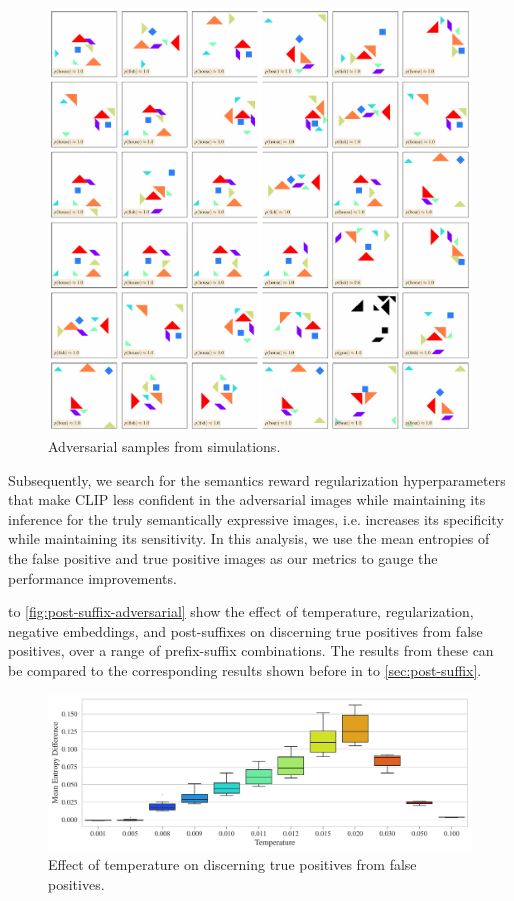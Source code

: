 \begin{figure}[h]
    \centering
    \includegraphics[width=\textwidth]{images/adversarial_samples.pdf}
    \caption{Adversarial samples from simulations.}
    \label{fig:semantic-bias-random}
\end{figure}

Subsequently, we search for the semantics reward regularization hyperparameters that make CLIP less confident in the adversarial images while maintaining its inference for the truly semantically expressive images, i.e. increases its specificity while maintaining its sensitivity.
In this analysis, we use the mean entropies of the false positive and true positive images as our metrics to gauge the performance improvements.

 to \ref{fig:post-suffix-adversarial} show the effect of temperature, regularization, negative embeddings, and post-suffixes on discerning true positives from false positives, over a range of prefix-suffix combinations.
The results from these can be compared to the corresponding results shown before in  to \ref{sec:post-suffix}.

\begin{figure}[H]
    \centering
    \includegraphics[width=\textwidth]{images/temperature_adversarial.pdf}
    \caption{Effect of temperature on discerning true positives from false positives.}
    \label{fig:clip-temperature-adversarial}
\end{figure}

